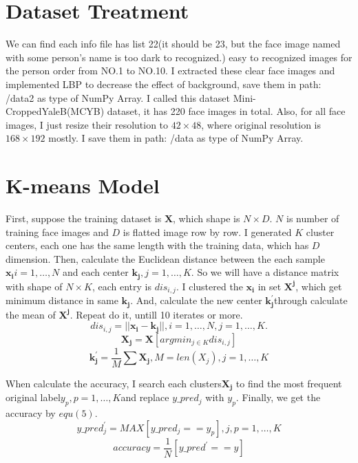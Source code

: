 \documentclass[10pt,twocolumn,letterpaper]{article}
\begin{document}
\section{Dataset Treatment}
We can find each info file has list 22(it should be 23, but the face image named with some person's name is too dark to recognized.) easy to recognized images for the person order from NO.1 to NO.10. I extracted these clear face images and implemented LBP to decrease the effect of background, save them in path: /data2 as type of NumPy Array. I called this dataset Mini-CroppedYaleB(MCYB) dataset, it has 220 face images in total. Also, for all face images, I just resize their resolution to $42\times 48$, where original resolution is $168\times 192$ mostly. I save them in path: /data as type of NumPy Array.

\section{K-means Model}
First, suppose the training dataset is $\bm{X}$, which shape is $N\times D$. $N$ is number of training face images and $D$ is flatted image row by row. I generated $K$ cluster centers, each one has the same length with the training data, which has $D$ dimension. Then, calculate the Euclidean distance between the each sample $\bm{x_i} i=1,\dots,N$ and each center $\bm{k_j}, j=1,\dots,K$. So we will have a distance matrix with shape of $N\times K$, each entry is $dis_{i,j}$. I clustered the $\bm{x_i}$ in set $\bm{X^j}$, which get minimum distance in same $\bm{k_j}$. And, calculate the new center $\bm{k_j^{\prime}}$through calculate the mean of $\bm{X^j}$. Repeat do it, untill 10 iterates or more.
\begin{equation}
dis_{i,j} = ||\bm{x_i} - \bm{k_j}||, i=1,\dots, N, j=1, \dots, K.
\end{equation}
\begin{equation}
\bm{X_j} = \bm{X}[argmin_{j\in K}dis_{i,j}]
\end{equation}
\begin{equation}
\bm{k_j^{\prime}} = \frac{1}{M} \sum\bm{X_j}, M = len(X_j), j = 1,\dots, K
\end{equation}
\par When calculate the accuracy, I search each clusters$\bm{X_j}$ to find the most frequent original label$y_p,p=1,\dots, K$and replace $y\_pred_j$ with $y_p$. Finally, we get the accuracy by $equ(5)$.
\begin{equation}
y\_pred_j^{\prime} = MAX[y\_pred_j==y_p], j,p=1,\dots, K
\end{equation}
\begin{equation}
accuracy = \frac{1}{N}[y\_pred^{\prime} == y]
\end{equation}
\end{document}
